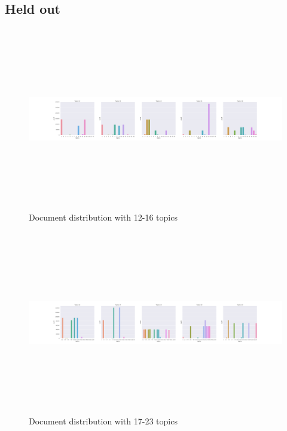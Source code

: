 \subsection{Held out}
\begin{figure}[h]
    \centering
    \includegraphics[width=15cm, height=8cm]{figures/doc_distr/doc_distribution_12-16_corpus.png}
    \caption{Document distribution with 12-16 topics}
    \label{fig:Doc_distr_12-16heldout}
\end{figure}

\begin{figure}[h]
    \centering
    \includegraphics[width=15cm, height=8cm]{figures/doc_distr/doc_distribution_17-23_corpus.png}
    \caption{Document distribution with 17-23 topics}
    \label{fig:Doc_distr_17-21heldout}
\end{figure}


